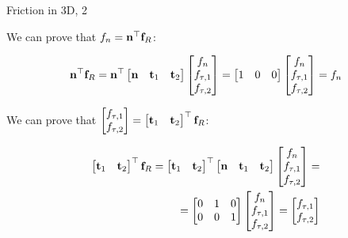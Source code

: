 \documentclass{beamer}
\begin{document}
\begin{frame}{Friction in 3D, 2}
	\begin{flushleft}
		
		We can prove that $f_n = \mathbf{n}^\top \mathbf{f}_R$:
		
		\begin{align}
			\mathbf{n}^\top \mathbf{f}_R = 
			\mathbf{n}^\top
			\begin{bmatrix}
				\mathbf{n} & \mathbf{t}_1 & \mathbf{t}_2
			\end{bmatrix}
			\begin{bmatrix}
				f_n \\ f_{\tau, 1} \\ f_{\tau, 2}
			\end{bmatrix}
			=
			\begin{bmatrix}
				1 & 0 & 0
			\end{bmatrix}
			\begin{bmatrix}
				f_n \\ f_{\tau, 1} \\ f_{\tau, 2}
			\end{bmatrix}
			=
			f_n 
		\end{align}
		
		
		We can prove that $\begin{bmatrix}
			f_{\tau, 1} \\ f_{\tau, 2}
		\end{bmatrix} = 
		\begin{bmatrix}
			\mathbf{t}_1 & \mathbf{t}_2
		\end{bmatrix}^\top \mathbf{f}_R$:
		
		\begin{align}
			\begin{bmatrix}
				\mathbf{t}_1 & \mathbf{t}_2
			\end{bmatrix}^\top \mathbf{f}_R = 
			\begin{bmatrix}
				\mathbf{t}_1 & \mathbf{t}_2
			\end{bmatrix}^\top
			\begin{bmatrix}
				\mathbf{n} & \mathbf{t}_1 & \mathbf{t}_2
			\end{bmatrix}
			\begin{bmatrix}
				f_n \\ f_{\tau, 1} \\ f_{\tau, 2}
			\end{bmatrix}
			= \\
			=
			\begin{bmatrix}
				0 & 1 & 0 \\
				0 & 0 & 1
			\end{bmatrix}
			\begin{bmatrix}
				f_n \\ f_{\tau, 1} \\ f_{\tau, 2}
			\end{bmatrix}
			=
			\begin{bmatrix}
				f_{\tau, 1} \\ f_{\tau, 2}
			\end{bmatrix}
		\end{align}
		
		
	\end{flushleft}
\end{frame}
\end{document}

